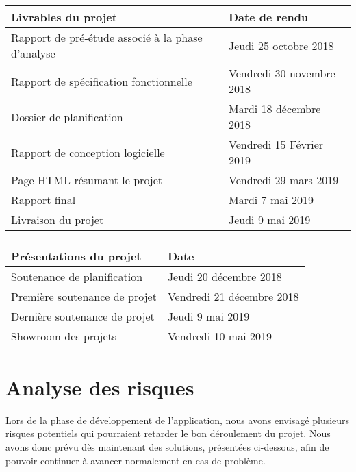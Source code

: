 \begin{center}

\begin{tabular}{ | l | l | }
	\hline
	\textbf{Livrables du projet} & \textbf{Date de rendu} \\
	\hline
	Rapport de pré-étude associé à la phase d'analyse & Jeudi 25 octobre 2018 \\
	\hline
	Rapport de spécification fonctionnelle  & Vendredi 30 novembre 2018 \\
	\hline
	Dossier de planification & Mardi 18 décembre 2018 \\
	\hline
	Rapport de conception logicielle & Vendredi 15 Février 2019 \\
	\hline
	Page HTML résumant le projet & Vendredi 29 mars 2019 \\
	\hline
	Rapport final  & Mardi 7 mai 2019 \\
	\hline
	Livraison du projet & Jeudi 9 mai 2019 \\
	\hline
\end{tabular}

\paragraph{}

\begin{tabular}{ | l | l | }
	\hline
	\textbf{Présentations du projet} & \textbf{Date} \\
	\hline
	Soutenance de planification  & Jeudi 20 décembre 2018 \\
	\hline
	Première soutenance de projet  & Vendredi 21 décembre 2018 \\
	\hline
	Dernière soutenance de projet & Jeudi 9 mai 2019 \\
	\hline
	Showroom des projets & Vendredi 10 mai 2019 \\
	\hline
\end{tabular}

\end{center}

\section{Analyse des risques}

Lors de la phase de développement de l’application, nous avons envisagé plusieurs risques potentiels qui pourraient retarder le bon déroulement du projet. Nous avons donc prévu dès maintenant des solutions, présentées ci-dessous, afin de pouvoir continuer à avancer normalement en cas de problème.

